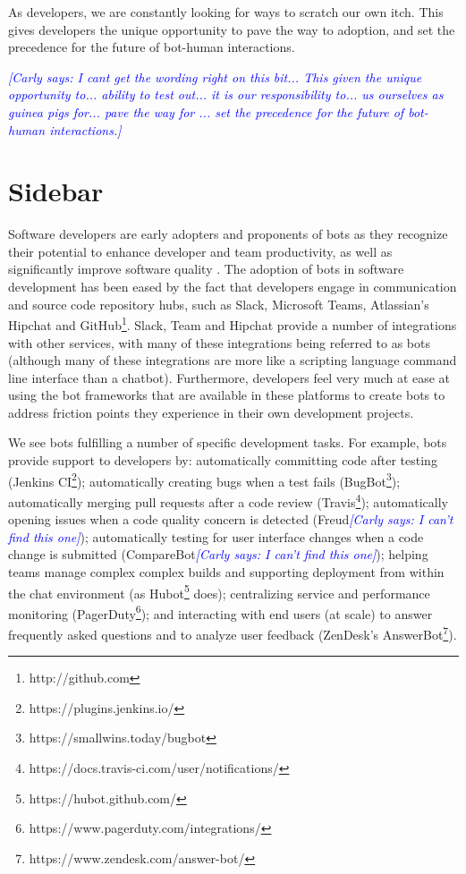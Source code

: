 \documentclass{sig-alternate}
\newcommand{\cl}[1]{\textcolor{blue}{{\it [Carly says: #1]}}}
\begin{document}
	As developers, we are constantly looking for ways to scratch our own itch.  This gives developers the unique opportunity to pave the way to adoption, and set the precedence for the future of bot-human interactions. 


	\cl{I cant get the wording right on this bit...  This given the unique opportunity to... ability to test out... it is our responsibility to... us ourselves as guinea pigs for... pave the way for ... set the precedence for the future of bot-human interactions.}



\section{Sidebar}

Software developers are early adopters and proponents of bots as they recognize their potential to enhance developer and team productivity, as well as significantly improve software quality \cite{storey2016disrupting}. 
The adoption of bots in software development has been eased by the fact that developers engage in communication and source code repository hubs, such as Slack, Microsoft Teams, Atlassian's Hipchat and GitHub\footnote{http://github.com}.  Slack, Team and Hipchat provide a number of integrations with other services, with many of these integrations being referred to as bots (although many of these integrations are more like a scripting language command line interface than a chatbot). 
Furthermore, developers feel very much at ease at using the bot frameworks that are available in these platforms to create bots to address friction points they experience in their own development projects. 
 
We see bots fulfilling a number of specific development tasks. For example, bots provide support to developers by:
automatically committing code after testing (Jenkins CI\footnote{https://plugins.jenkins.io/}); 
automatically creating bugs when a test fails (BugBot\footnote{https://smallwins.today/bugbot}); 
automatically merging pull requests after a code review (Travis\footnote{https://docs.travis-ci.com/user/notifications/}); 
automatically opening issues when a code quality concern is detected (Freud\cl{I can't find this one});
automatically testing for user interface changes when a code change is submitted (CompareBot\cl{I can't find this one}); 
helping teams manage complex complex builds and supporting deployment from within the chat environment (as Hubot\footnote{https://hubot.github.com/} does); 
centralizing service and performance monitoring (PagerDuty\footnote{https://www.pagerduty.com/integrations/}); 
and interacting with end users (at scale) to answer frequently asked questions and to analyze user feedback (ZenDesk's AnswerBot\footnote{https://www.zendesk.com/answer-bot/}).
\end{document}

